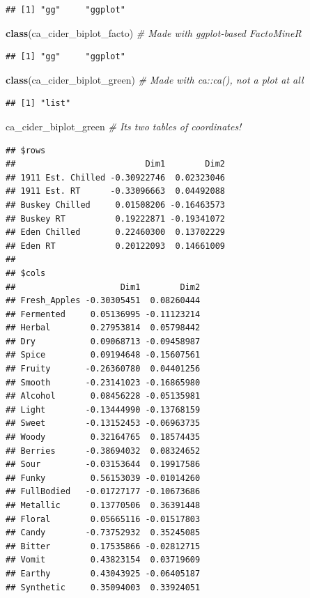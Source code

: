 \documentclass[
]{book}
\newenvironment{Shaded}{\begin{snugshade}}{\end{snugshade}}
\newcommand{\CommentTok}[1]{\textcolor[rgb]{0.56,0.35,0.01}{\textit{#1}}}
\newcommand{\FunctionTok}[1]{\textcolor[rgb]{0.13,0.29,0.53}{\textbf{#1}}}
\newcommand{\NormalTok}[1]{#1}
\begin{document}
\begin{verbatim}
## [1] "gg"     "ggplot"
\end{verbatim}

\begin{Shaded}
\begin{Highlighting}[]
\FunctionTok{class}\NormalTok{(ca\_cider\_biplot\_facto) }\CommentTok{\# Made with ggplot{-}based FactoMineR}
\end{Highlighting}
\end{Shaded}

\begin{verbatim}
## [1] "gg"     "ggplot"
\end{verbatim}

\begin{Shaded}
\begin{Highlighting}[]
\FunctionTok{class}\NormalTok{(ca\_cider\_biplot\_green) }\CommentTok{\# Made with ca::ca(), not a plot at all}
\end{Highlighting}
\end{Shaded}

\begin{verbatim}
## [1] "list"
\end{verbatim}

\begin{Shaded}
\begin{Highlighting}[]
\NormalTok{ca\_cider\_biplot\_green }\CommentTok{\# It\textquotesingle{}s two tables of coordinates!}
\end{Highlighting}
\end{Shaded}

\begin{verbatim}
## $rows
##                          Dim1        Dim2
## 1911 Est. Chilled -0.30922746  0.02323046
## 1911 Est. RT      -0.33096663  0.04492088
## Buskey Chilled     0.01508206 -0.16463573
## Buskey RT          0.19222871 -0.19341072
## Eden Chilled       0.22460300  0.13702229
## Eden RT            0.20122093  0.14661009
## 
## $cols
##                     Dim1        Dim2
## Fresh_Apples -0.30305451  0.08260444
## Fermented     0.05136995 -0.11123214
## Herbal        0.27953814  0.05798442
## Dry           0.09068713 -0.09458987
## Spice         0.09194648 -0.15607561
## Fruity       -0.26360780  0.04401256
## Smooth       -0.23141023 -0.16865980
## Alcohol       0.08456228 -0.05135981
## Light        -0.13444990 -0.13768159
## Sweet        -0.13152453 -0.06963735
## Woody         0.32164765  0.18574435
## Berries      -0.38694032  0.08324652
## Sour         -0.03153644  0.19917586
## Funky         0.56153039 -0.01014260
## FullBodied   -0.01727177 -0.10673686
## Metallic      0.13770506  0.36391448
## Floral        0.05665116 -0.01517803
## Candy        -0.73752932  0.35245085
## Bitter        0.17535866 -0.02812715
## Vomit         0.43823154  0.03719609
## Earthy        0.43043925 -0.06405187
## Synthetic     0.35094003  0.33924051
\end{verbatim}
\end{document}
